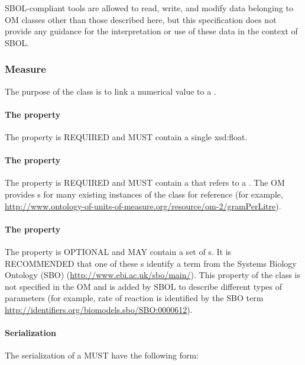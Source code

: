 SBOL-compliant tools are allowed to read, write, and modify data belonging to OM classes other than those described here, but this specification does not provide any guidance for the interpretation or use of these data in the context of SBOL.


\subsubsection{Measure}
\label{sec:Measure}

The purpose of the  class is to link a numerical value to a . 

\paragraph{The  property}\label{sec:hasNumericalValue}
The  property is REQUIRED and MUST contain a single xsd:float.

\paragraph{The  property}\label{sec:hasUnit:Measure}
The  property is REQUIRED and MUST contain a  that refers to a . The OM provides s for many existing instances of the  class for reference (for example, \url{http://www.ontology-of-units-of-measure.org/resource/om-2/gramPerLitre}).

\paragraph{The  property}\label{sec:types:Measure}
The  property is OPTIONAL and MAY contain a set of s. It is RECOMMENDED that one of these s identify a term from the Systems Biology Ontology (SBO) (\url{http://www.ebi.ac.uk/sbo/main/}). This  property of the  class is not specified in the OM and is added by SBOL to describe different types of parameters (for example, rate of reaction is identified by the SBO term \url{http://identifiers.org/biomodels.sbo/SBO:0000612}).

\paragraph{Serialization}
The serialization of a  MUST have the following form:


